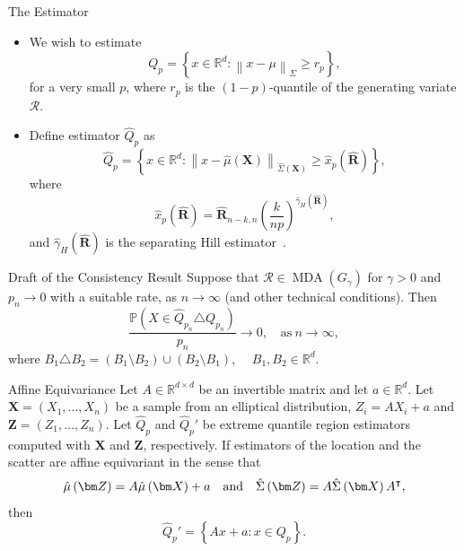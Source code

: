 \documentclass[11pt, aspectratio=169]{beamer}
\DeclareMathOperator{\mda}{MDA}
\begin{document}
\begin{frame}{The Estimator}
  \begin{itemize}
    \item We wish to estimate
    \begin{equation*}
      Q_{p} = \left\{x \in \mathbb{R}^d : \left\|x - \mu\right\|_\Sigma \geq r_{p}\right\},
    \end{equation*}
    for a very small $p$, where $r_{p}$ is the $(1-p)$-quantile of the
    generating variate $\mathcal{R}$. \pause
    \item Define estimator $\hat Q_{p}$ as
    \begin{equation*}
      \hat Q_{p} = \left\{x \in \mathbb{R}^d :
      \left\|x - \hat\mu\left(\bm X\right)\right\|_{\hat\Sigma\left(\bm X\right)}
      \geq \hat x_{p}(\hat{\bm R})\right\},
    \end{equation*}
    where
    \begin{equation*}
      \hat x_{p}(\hat{\bm R}) = \hat{\bm R}_{n-k, n}
      \left(\frac{k}{np}\right)^{\hat\gamma_H(\hat{\bm R})},
    \end{equation*}
    and $\hat\gamma_H(\hat{\bm R})$ is the separating Hill
    estimator~\parencite{heikkila2019}.
  \end{itemize}
\end{frame}


\begin{frame}{Draft of the Consistency Result}
  Suppose that $\mathcal{R}\in\mda\left(G_\gamma\right)$ for $\gamma > 0$ and
  $p_n\to 0$ with a suitable rate, as $n\to\infty$ (and other technical
  conditions). Then
  \begin{equation*}
    \frac{\mathbb{P}\left(X\in\hat Q_{p_n}\triangle Q_{p_n}\right)}{p_n}
    \to 0, \quad \text{as}\ n\to\infty,
  \end{equation*}
  where $B_1\triangle B_2 = (B_1\setminus B_2) \cup (B_2\setminus B_1)$, $\quad
  B_1,B_2\in\mathbb{R}^d$. 
\end{frame}


\begin{frame}{Affine Equivariance}
  Let $A\in\mathbb{R}^{d\times d}$ be an invertible matrix and let
  $a\in\mathbb{R}^d$. Let $\bm X = \left(X_1, \ldots, X_n\right)$ be a sample
  from an elliptical distribution, $Z_i = AX_i + a$ and $\bm Z = \left(Z_1,
  \ldots, Z_n\right)$. Let $\hat Q_p$ and $\hat Q_p'$ be extreme quantile region
  estimators computed with $\bm X$ and $\bm Z$, respectively. If estimators of
  the location and the scatter are affine equivariant in the sense that
  \begin{equation*}
    \hat\mu\left(\bm Z\right) = A\hat\mu\left(\bm X\right) + a
    \quad\textnormal{and}\quad
    \hat\Sigma\left(\bm Z\right) = A\hat\Sigma\left(\bm X\right) A^\intercal,
  \end{equation*}
  then
  \begin{equation*}
    \hat Q_p' = \left\{Ax + a: x\in Q_p\right\}.
  \end{equation*}
\end{frame}
\end{document}
